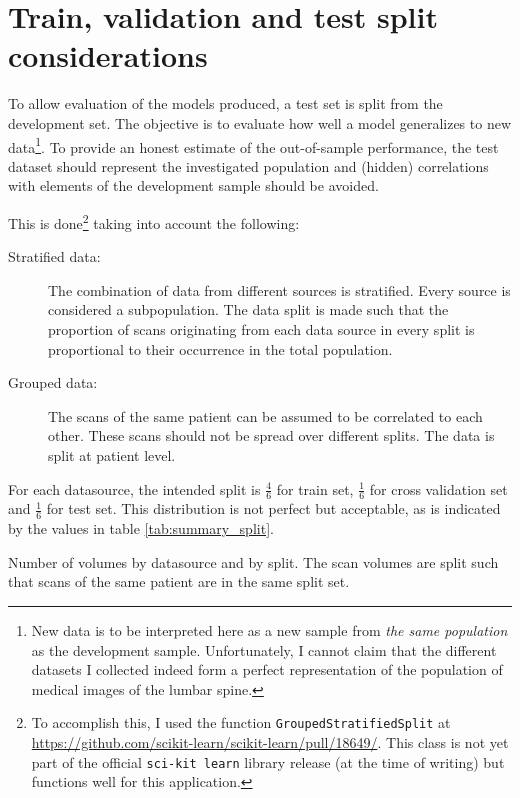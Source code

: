 \section{Train, validation and test split considerations\label{sec:trainValTestSplit}}

To allow evaluation of the models produced, a test set is split from the development set.
The objective is to evaluate how well a model generalizes to new data\footnote{
    New data is to be interpreted here as a new sample from \textit{the same population} as the development sample.
    Unfortunately, I cannot claim that the different datasets I collected indeed form a perfect representation of the population of medical images of the lumbar spine.}. 
To provide an honest estimate of the out-of-sample performance, the test dataset should represent the investigated population and (hidden) correlations with elements of the development sample should be avoided.

This is done\footnote{
    To accomplish this, I used the function \texttt{GroupedStratifiedSplit} at \url{https://github.com/scikit-learn/scikit-learn/pull/18649/}. 
    This class is not yet part of the official \texttt{sci-kit learn} library release (at the time of writing) but functions well for this application.} taking into account the following:
\begin{description}
    \item[Stratified data:] The combination of data from different sources is stratified. Every source is considered a subpopulation. The data split is made such that the proportion of scans originating from each data source in every split is proportional to their occurrence in the total population.
    \item[Grouped data:] The scans of the same patient can be assumed to be correlated to each other. These scans should not be spread over different splits. The data is split at patient level.
\end{description}

For each datasource, the intended split is $\frac{4}{6}$ for train set, $\frac{1}{6}$ for cross validation set and $\frac{1}{6}$ for test set.
This distribution is not perfect but acceptable, as is indicated by the values in table \ref{tab:summary_split}.

\begin{table}
 
    
    \caption{Number of volumes by datasource and by split. The scan volumes are split such that scans of the same patient are in the same split set.\label{tab:summary_split}}
  
  \end{table}

